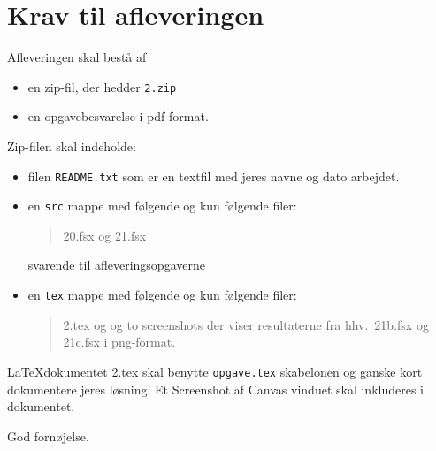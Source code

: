\documentclass[a4paper,12pt]{article}
\newcommand{\exerciseNumber}{2}
\begin{document}
\section*{Krav til afleveringen}
Afleveringen skal bestå af
\begin{itemize}
  \item en zip-fil, der hedder \texttt{\exerciseNumber\typeLetter.zip}
  \item en opgavebesvarelse i pdf-format.
\end{itemize}
Zip-filen skal indeholde:
\begin{itemize}
\item filen \texttt{README.txt} som er en textfil med jeres navne og dato arbejdet.
\item en \texttt{src} mappe med følgende og kun
  følgende filer:
  \begin{quote}
    \exerciseNumber\typeLetter0.fsx og \exerciseNumber\typeLetter1.fsx
  \end{quote}
  svarende til afleveringsopgaverne
\item en \texttt{tex} mappe med følgende og kun følgende filer:
  \begin{quote}
    \exerciseNumber\typeLetter.tex og og to screenshots der viser resultaterne fra hhv.\ \exerciseNumber\typeLetter1b.fsx og \exerciseNumber\typeLetter1c.fsx i png-format.
  \end{quote}
\end{itemize}
\LaTeX dokumentet \exerciseNumber\typeLetter.tex skal benytte \lstinline[language=console]{opgave.tex} skabelonen og ganske kort dokumentere jeres løsning. Et Screenshot af Canvas vinduet skal inkluderes i dokumentet.

\flushright God fornøjelse.
\end{document}
